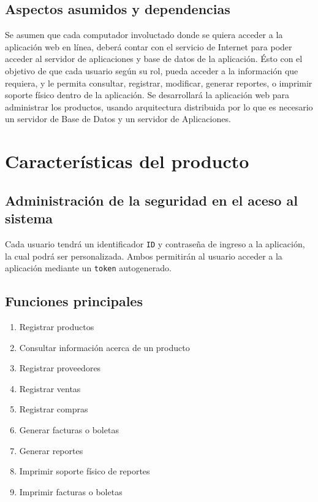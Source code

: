 \documentclass[a4paper,11pt, spanish]{report}
\newcommand{\inlinecode}[1]{%
  \colorbox{light-gray}{\texttt{#1}}
}
\begin{document}
{{{{{      \subsection{Aspectos asumidos y dependencias}
        Se asumen que cada computador involuctado donde se quiera acceder a la aplicación web en línea, deberá contar con el servicio de Internet para poder acceder al servidor de aplicaciones y base de datos de la aplicación. Ésto con el objetivo de que cada usuario según su rol, pueda acceder a la información que requiera, y le permita consultar, registrar, modificar, generar reportes, o imprimir soporte físico dentro de la aplicación.
        Se desarrollará la aplicación web para administrar los productos, usando arquitectura distribuida por lo que es necesario un servidor de Base de Datos y un servidor de Aplicaciones.

    \section{Características del producto}
      \subsection{Administración de la seguridad en el aceso al sistema}
        Cada usuario tendrá un identificador \inlinecode{ID}  y contraseña de ingreso a la aplicación, la cual podrá ser personalizada. Ambos permitirán al usuario acceder a la aplicación mediante un \inlinecode{token} autogenerado.
      \subsection{Funciones principales}
      \begin{enumerate}[\indent\textbullet]
        \item Registrar productos
        \item Consultar información acerca de un producto
        \item Registrar proveedores
        \item Registrar ventas
        \item Registrar compras
        \item Generar facturas o boletas
        \item Generar reportes
        \item Imprimir soporte físico de reportes
        \item Imprimir facturas o boletas
      \end{enumerate}

}}}}}
\end{document}
